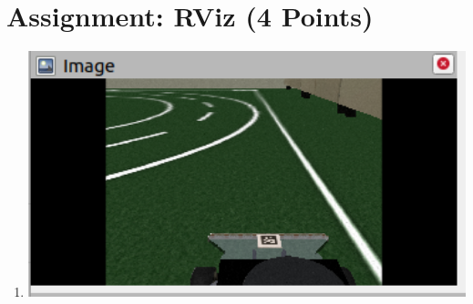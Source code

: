 

\newcommand{\dozent}{Prof. Goehring}
\newcommand{\tutor}{-}
\newcommand{\tutoriumNo}{01\\Materialien: Latex, Skript, Ros}
\newcommand{\ubungNo}{2}
\newcommand{\veranstaltung}{Robotik}
\newcommand{\semester}{WS21/22}
\newcommand{\studenten}{David Ly \& Ina Fendel \& Thore Brehmer}




\section{Assignment: RViz (4 Points)}
\begin{enumerate}[\\ \\]
    \item \includegraphics[width=1\textwidth]{src/u2/asg2_1.png}
\end{enumerate}   

